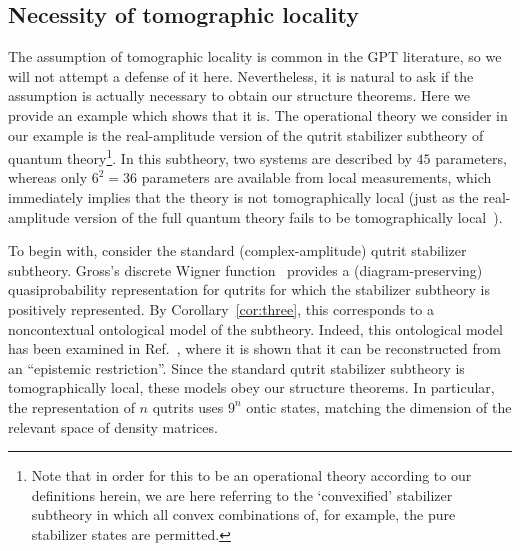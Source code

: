 \documentclass[onecolum,aps,groupedaddress,nofootinbib]{revtex4-2}
\newcommand{\rob}{\color{cyan}}
\newcommand{\blk}{\color{black}}
\begin{document}
\subsection{Necessity of tomographic locality} \label{neclt}
The assumption of tomographic locality is common in the GPT literature, so we will not attempt a defense of it here. Nevertheless, it is natural to ask if the assumption is actually necessary to obtain our structure theorems. Here we provide an example which shows that it is. The operational theory we consider in our example is the real-amplitude version of the qutrit stabilizer subtheory of quantum theory\footnote{Note that in order for this to be an operational theory according to our definitions herein, we are here referring to the `convexified' stabilizer subtheory in which all convex combinations of, for example, the pure stabilizer states are permitted.}. In this subtheory, two systems are described by $45$ parameters, whereas only $6^2 = 36$ parameters are available from local measurements, which immediately implies that the theory is not tomographically local (just as the real-amplitude version of the full quantum theory fails to be tomographically local~\cite{hardy2012limited}).

To begin with, consider the standard (complex-amplitude) qutrit stabilizer subtheory. Gross's discrete Wigner function~\cite{gross2006} 
provides a (diagram-preserving) quasiprobability representation for qutrits for which the stabilizer subtheory is positively represented.  By Corollary~\ref{cor:three}, this corresponds to a noncontextual ontological model of the subtheory. 
Indeed, this ontological model has been examined in Ref.~\cite{epistricted}, where it is shown that it can be reconstructed from an ``epistemic restriction''. Since the standard qutrit stabilizer subtheory is tomographically local, these models obey our structure theorems. In particular, the representation of $n$ qutrits uses $9^n$ ontic states, matching the dimension of the relevant space of density matrices.
\end{document}
